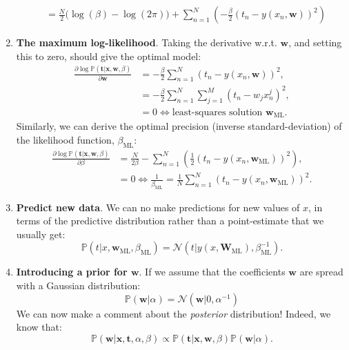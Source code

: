 \documentclass{article}
\begin{document}
\begin{enumerate}
\begin{align}
        &=\frac{N}{2}\bigg(\log(\beta) - \log(2\pi)\bigg) + \sum_{n=1}^N \left( -\frac{\beta}{2}(t_n-y(x_n,\mathbf{w}))^2          \right)
    \end{align}
    \item \textbf{The maximum log-likelihood}. Taking the derivative w.r.t. $\mathbf{w}$, and setting this to zero, should give the optimal model:
    \begin{align}
        \frac{\partial \log\mathbb{P}(\mathbf{t}|\mathbf{x},\mathbf{w},\beta)}{\partial \mathbf{w}} &= - \frac{\beta}{2}\sum_{n=1}^N(t_n-y(x_n,\mathbf{w}))^2,\\
        &=-\frac{\beta}{2}\sum_{n=1}^N\sum_{j=1}^M(t_n-w_jx_n^j)^2,\\
        &=0\Longleftrightarrow \text{least-squares solution }\mathbf{w}_\text{ML}. 
    \end{align}
    Similarly, we can derive the optimal precision (inverse standard-deviation) of the likelihood function, $\beta_\text{ML}$:
    \begin{align}
        \frac{\partial \log\mathbb{P}(\mathbf{t}|\mathbf{x},\mathbf{w},\beta)}{\partial \beta} & = \frac{N}{2\beta} - \sum_{n=1}^N\left( \frac{1}{2}(t_n - y(x_n,\mathbf{w}_\text{ML}))^2 \right),\\
        &=0 \Longleftrightarrow \frac{1}{\beta_\text{ML}} = \frac{1}{N}\sum_{n=1}^N(t_n - y(x_n,\mathbf{w}_\text{ML}))^2.
    \end{align}
    \item \textbf{Predict new data}. We can no make predictions for new values of $x$, in terms of the predictive distribution rather than a point-estimate that we usually get:
    \begin{equation}
        \mathbb{P}(t|x,\mathbf{w}_\text{ML},\beta_\text{ML}) = \mathcal{N}(t|y(x,\mathbf{W}_\text{ML}),\beta_{\text{ML}}^{-1}).
    \end{equation}
    \item \textbf{Introducing a prior for $\mathbf{w}$}. If we assume that the coefficients $\mathbf{w}$ are spread with a Gaussian distribution:
    \begin{equation}
        \mathbb{P}(\mathbf{w}|\alpha) = \mathcal{N}(\mathbf{w}|0,\alpha^{-1})
    \end{equation}
    We can now make a comment about the \textit{posterior} distribution! Indeed, we know that:
    \begin{equation}
        \mathbb{P}(\mathbf{w}|\mathbf{x},\mathbf{t},\alpha,\beta) \propto \mathbb{P}(\mathbf{t}|\mathbf{x},\mathbf{w},\beta)\mathbb{P}(\mathbf{w}|\alpha).

\end{equation}
\end{enumerate}
\end{document}
